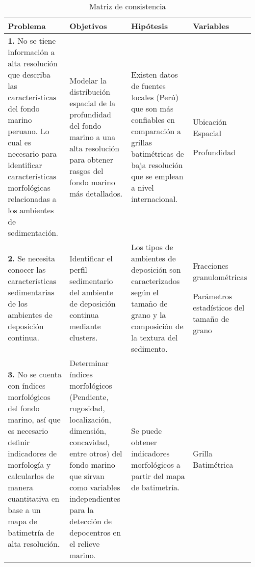 \begin{table}[H]\scriptsize
\caption{Matriz de consistencia}
\label{cua:mat2}
\centering
\begin{tabular}{ |p{0.25\linewidth}|p{0.25\linewidth}|p{0.25\linewidth}|p{0.25\linewidth}|}
\hline
\textbf{Problema} & \textbf{Objetivos} & \textbf{Hipótesis} & \textbf{Variables}\\ \hline \hline
\textbf{1.} No se tiene información a alta resolución que describa las características del fondo marino peruano. Lo cual es necesario para identificar características morfológicas relacionadas a los ambientes de sedimentación.&Modelar la distribución espacial de la profundidad del fondo marino a una alta resolución para obtener rasgos del fondo marino más detallados.  & Existen datos de fuentes locales (Perú) que son más confiables en comparación a grillas batimétricas de baja resolución que se emplean a nivel internacional. &
\begin{noindlist}
\item Ubicación Espacial
\item Profundidad
\end{noindlist}\\ \hline
\textbf{2.} Se necesita conocer las características sedimentarias de los ambientes de deposición continua. & Identificar el perfil sedimentario del ambiente de deposición continua mediante clusters.  & Los tipos de ambientes de deposición son caracterizados según el tamaño de grano y la composición de la textura del sedimento. &
\begin{noindlist}
\item Fracciones granulométricas
\item Parámetros estadísticos del tamaño de grano
\end{noindlist}\\ \hline
\textbf{3.} No se cuenta con índices morfológicos del fondo marino, así que es necesario definir indicadores de morfología y calcularlos de manera cuantitativa en base a un mapa de batimetría de alta resolución.&Determinar índices morfológicos (Pendiente, rugosidad, localización, dimensión, concavidad, entre otros) del fondo marino que sirvan como variables independientes para la detección de depocentros en el relieve marino.  &Se puede obtener indicadores morfológicos a partir del mapa de batimetría.  &
\begin{noindlist}
\item Grilla Batimétrica
\end{noindlist}\\ \hline

\end{tabular}
\end{table}

